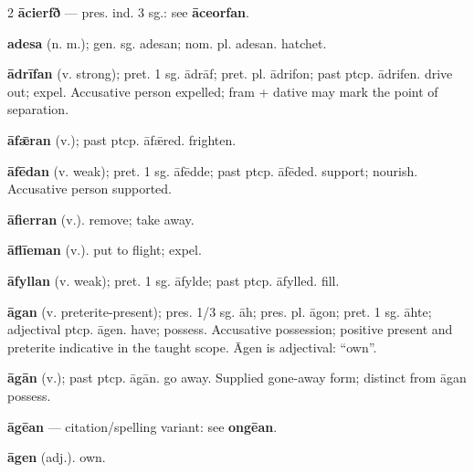 \begin{multicols*}{2}
\textbf{ācierfð} — pres. ind. 3 sg.: see \textbf{āceorfan}.\par
\textbf{adesa} (n. m.); gen. sg. adesan; nom. pl. adesan. hatchet.\par
\textbf{ādrīfan} (v. strong); pret. 1 sg. ādrāf; pret. pl. ādrifon; past ptcp. ādrifen. drive out; expel. Accusative person expelled; fram + dative may mark the point of separation.\par
\textbf{āfǣran} (v.); past ptcp. āfǣred. frighten.\par
\textbf{āfēdan} (v. weak); pret. 1 sg. āfēdde; past ptcp. āfēded. support; nourish. Accusative person supported.\par
\textbf{āfierran} (v.). remove; take away.\par
\textbf{āflīeman} (v.). put to flight; expel.\par
\textbf{āfyllan} (v. weak); pret. 1 sg. āfylde; past ptcp. āfylled. fill.\par
\textbf{āgan} (v. preterite-present); pres. 1/3 sg. āh; pres. pl. āgon; pret. 1 sg. āhte; adjectival ptcp. āgen. have; possess. Accusative possession; positive present and preterite indicative in the taught scope. Āgen is adjectival: “own”.\par
\textbf{āgān} (v.); past ptcp. āgān. go away. Supplied gone-away form; distinct from āgan possess.\par
\textbf{āgēan} — citation/spelling variant: see \textbf{ongēan}.\par
\textbf{āgen} (adj.). own.\par

\end{multicols*}
